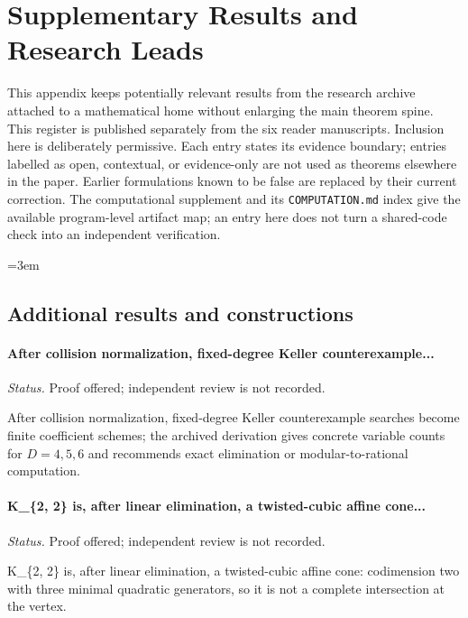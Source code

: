 \section{Supplementary Results and Research Leads}
\label{app:supplementary-register-02}

This appendix keeps potentially relevant results from the research
archive attached to a mathematical home without enlarging the main
theorem spine.  This register is published separately from the six reader manuscripts.  Inclusion here is deliberately permissive.  Each entry
states its evidence boundary; entries labelled as open, contextual, or
evidence-only are not used as theorems elsewhere in the paper.  Earlier
formulations known to be false are replaced by their current correction.
The computational supplement and its \texttt{COMPUTATION.md} index give
the available program-level artifact map; an entry here does not turn a
shared-code check into an independent verification.
\begingroup\raggedright\emergencystretch=3em

\subsection{Additional results and constructions}

\label{supp-note-02-001}
\paragraph{After collision normalization, fixed-degree Keller counterexample...}
\emph{Status.} Proof offered; independent review is not recorded.

After collision normalization, fixed-degree Keller counterexample searches
become finite coefficient schemes; the archived derivation gives concrete
variable counts for \(D=4,5,6\) and recommends exact elimination or
modular-to-rational computation.

\label{supp-note-02-002}
\paragraph{K\_\{2, 2\} is, after linear elimination, a twisted-cubic affine cone...}
\emph{Status.} Proof offered; independent review is not recorded.

K\_\{2, 2\} is, after linear elimination, a twisted-cubic affine cone: codimension two with three minimal quadratic generators, so it is not a complete intersection at the vertex.

